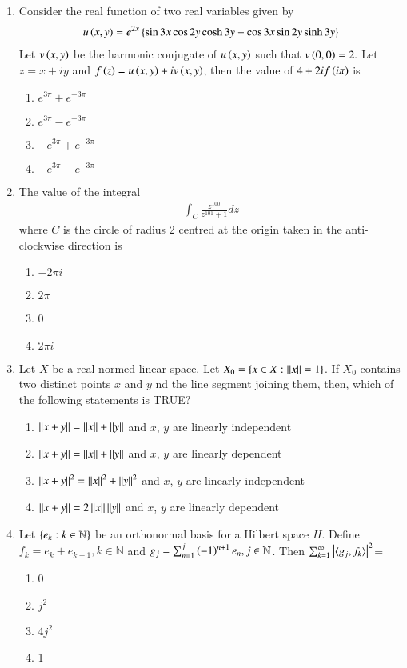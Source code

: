 \documentclass[journal,12pt,onecolumn]{IEEEtran}
\theoremstyle{remark}
\begin{document}
\begin{enumerate}
\item Consider the real function of two real variables given by
	\begin{align*}
		u\left(x,y\right)=e^{2x}\left\{\sin 3x \cos 2y \cosh 3y - \cos 3x \sin 2y \sinh 3y\right\}
	\end{align*}
Let $v\left(x,y\right)$ be the harmonic conjugate of $u\left(x,y\right)$ such that $v\left(0,0\right)=2.$ Let $z=x+iy$ and $f\left(z\right)=u\left(x,y\right)+iv\left(x,y\right)$, then the value of $4+2if\left(i \pi\right)$ is
	\begin{enumerate}
		\item $e^{3 \pi}+e^{-3 \pi}$
		\item $e^{3 \pi}-e^{-3 \pi}$
		\item $-e^{3 \pi}+e^{-3 \pi}$
		\item $-e^{3 \pi}-e^{-3 \pi}$
	\end{enumerate}

\item The value of the integral 
	\begin{align*}
		\int_{C} \frac{z^{100}}{z^{101}+1} dz
	\end{align*}
	where $C$ is the circle of radius 2 centred at the origin taken in the anti-clockwise
direction is
	\begin{enumerate}
		\item $-2 \pi i$
		\item $2 \pi$
		\item 0
		\item $2 \pi i$
	\end{enumerate}

\item Let $X$ be a real normed linear space. Let $X_0 = \left\{ x \in X: \left\lVert x\right\rVert=1\right\}$. If $X_0$ contains two distinct points $x$ and $y$ nd the line segment joining them, then, which of the following statements is TRUE?
	\begin{enumerate}
		\item $\left\lVert x+y\right\rVert=\left\lVert x\right\rVert+\left\lVert y\right\rVert$ and $x$, $y$ are linearly independent
		\item $\left\lVert x+y\right\rVert=\left\lVert x\right\rVert+\left\lVert y\right\rVert$ and $x$, $y$ are linearly dependent
		\item $\left\lVert x+y\right\rVert^{2}=\left\lVert x\right\rVert^{2}+\left\lVert y\right\rVert^{2}$ and $x$, $y$ are linearly independent
		\item $\left\lVert x+y\right\rVert=2\left\lVert x\right\rVert \left\lVert y\right\rVert$ and $x$, $y$ are linearly dependent
	\end{enumerate}

\item Let $\left\{e_k : k \in \mathbb{N}\right\}$ be an orthonormal basis for a Hilbert space $H$. Define $f_k = e_k +e_{k+1}, k\in \mathbb{N}$ and $g_j = \sum^{j} _{n=1} \left(-1\right)^{n+1} e_n, j \in \mathbb{N}$. Then $\sum _{k=1} ^{\infty} \left\vert\langle g_j, f_k \rangle\right\vert^{2}$=
	 \begin{enumerate}
		\item 0
		\item $j^2$
		\item 4$j^2$
		\item 1
	 \end{enumerate}


\end{enumerate}
\end{document}
